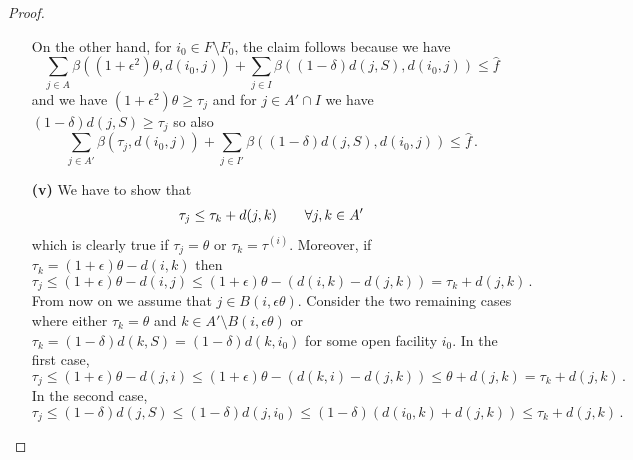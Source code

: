 \begin{proof}
\begin{enumerate}
        On the other hand, for $i_0 \in F \setminus F_0$, the claim follows because we have 
        \[
\sum_{j \in A} \beta((1+\epsilon^2)\theta, d(i_0,j)) + \sum_{j \in I} \beta((1-\delta)d(j, S), d(i_0,j)) \leq \hat f
    \]
        and we have $(1+\epsilon^2)\theta \geq \tau_j$ and for $j \in A' \cap I$ we have $(1-\delta)d(j, S) \geq \tau_j$ so also
        \[
\sum_{j \in A'} \beta(\tau_j, d(i_0,j)) + \sum_{j \in I'} \beta((1-\delta)d(j, S), d(i_0,j)) \leq \hat f\,.
    \]
        \item[\textbf{(v)}] We have to show that
              \[
                  \tau_j \le \tau_k + d(j,k)
                  \qquad \forall j,k\in A'
              \]
              which is clearly true if $\tau_j = \theta$ or $\tau_k = \tau^{(i)}$. Moreover, if $\tau_k = (1+\epsilon)\theta - d(i,k)$ then
              \[
                \tau_j \leq (1+\epsilon) \theta - d(i, j) \leq (1+\epsilon) \theta - (d(i, k) - d(j, k)) = \tau_k + d(j,k)\,.
            \]
            From now on we assume that $j \in B(i,\epsilon \theta)$. 
            Consider the two remaining cases where either $\tau_k =\theta$ and $k \in A' \setminus B(i,\epsilon \theta)$ or $\tau_k = (1-\delta)d(k,S) = (1-\delta)d(k,i_0)$ for some open facility $i_0$. In the first case,
              \[
                \tau_j \le (1+\epsilon) \theta - d(j,i) \le (1+\epsilon) \theta - (d(k,i) - d(j,k)) \le \theta + d(j,k) = \tau_k + d(j,k)\,.
              \]
              In the second case, 
              \[
                \tau_j \le (1-\delta)d(j,S) \le (1-\delta)d(j,i_0) \le (1-\delta) (d(i_0,k) + d(j,k)) \le \tau_k + d(j,k)\,.
              \]
    \end{enumerate}
\end{proof}

